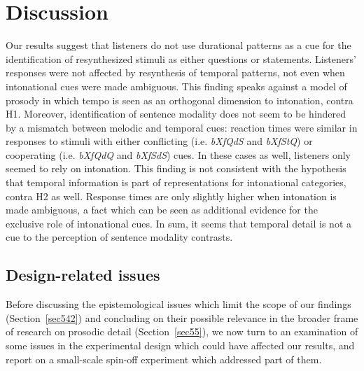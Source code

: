 \section{Discussion}\label{sec54}
Our results suggest that listeners do not use durational patterns as a cue for the identification of resynthesized stimuli as either questions or statements. Listeners' responses were not affected by resynthesis of temporal patterns, not even when intonational cues were made ambiguous. This finding speaks against a model of prosody in which tempo is seen as an orthogonal dimension to intonation, contra H1.
Moreover, identification of sentence modality does not seem to be hindered by a mismatch between melodic and temporal cues: reaction times were similar in responses to stimuli with either conflicting (i.e. \textit{bXfQdS} and \textit{bXfStQ}) or cooperating (i.e. \textit{bXfQdQ} and \textit{bXfSdS}) cues. In these cases as well, listeners only seemed to rely on intonation. This finding is not consistent with the hypothesis that temporal information is part of representations for intonational categories, contra H2 as well. Response times are only slightly higher when intonation is made ambiguous, a fact which can be seen as additional evidence for the exclusive role of intonational cues.
In sum, it seems that temporal detail is not a cue to the perception of sentence modality contrasts.
\subsection{Design-related issues}\label{sec541}
Before discussing the epistemological issues which limit the scope of our findings (Section~\ref{sec542}) and concluding on their possible relevance in the broader frame of research on prosodic detail (Section~\ref{sec55}), we now turn to an examination of some issues in the experimental design which could have affected our results, and report on a small-scale spin-off experiment which addressed part of them.
